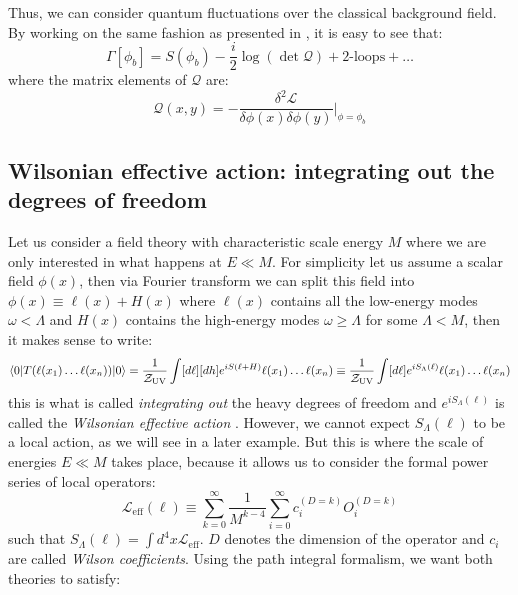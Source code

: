 \documentclass[11pt]{article}
\begin{document}
Thus, we can consider quantum fluctuations over the classical background field. By working on the same fashion as presented in \cite{RodriguezCalleja:2025ljh}, it is easy to see that:
\begin{equation}\label{effectiveaction}
    \Gamma[\phi_b]=S(\phi_b)-\dfrac{i}{2}\log(\det \mathcal{Q})+\text{2-loops}+\ldots
\end{equation}
where the matrix elements of $\mathcal{Q}$ are:
\begin{equation}
     \mathcal{Q}(x,y)= -\dfrac{\delta^2\mathcal{L}}{\delta\phi(x)\delta\phi(y)}\Bigg|_{\phi=\phi_b}
\end{equation}
\subsection{Wilsonian effective action: integrating out the degrees of freedom}
Let us consider a field theory with characteristic scale energy $M$ where we are only interested in what happens at $E\ll M$. For simplicity let us assume a scalar field $\phi(x)$, then via Fourier transform we can split this field into $\phi(x)\equiv \ell(x)+H(x)$ where $\ell(x)$ contains all the low-energy modes $\omega<\Lambda$ and $H(x)$ contains the high-energy modes $\omega\ge \Lambda$ for some $\Lambda<M$, then it makes sense to write:
\begin{equation}\label{intergratingout}
    \braket{0|T(\ell(x_1)\ldots \ell(x_n))|0}=\dfrac{1}{\mathcal{Z}_{\text{UV}}}\int [d\ell][dh]e^{iS(\ell+H)}\ell(x_1)\ldots \ell(x_n)\equiv \dfrac{1}{\mathcal{Z}_{\text{UV}}}\int [d\ell]e^{iS_\Lambda(\ell)}\ell(x_1)\ldots \ell(x_n)
\end{equation}
this is what is called \textit{integrating out} the heavy degrees of freedom and $e^{iS_\Lambda(\ell)}$ is called the \textit{Wilsonian effective action} \cite{Wilson:1973jj}. However, we cannot expect $S_\Lambda(\ell)$ to be a local action, as we will see in a later example. But this is where the scale of energies $E\ll M$ takes place, because it allows us to consider the formal power series of local operators:
\begin{equation}\label{effectivelagrangian}
    \mathcal{L}_{\text{eff}}(\ell)\equiv \sum_{k=0}^{\infty}\dfrac{1}{M^{k-4}}\sum_{i=0}^{\infty}c_i^{(D=k)}O_i^{(D=k)} 
\end{equation}
such that $S_\Lambda(\ell)=\int d^4x\mathcal{L}_{\text{eff}}$. $D$ denotes the dimension of the operator and $c_i$ are called \textit{Wilson coefficients}. Using the path integral formalism, we want both theories to satisfy:
\end{document}
